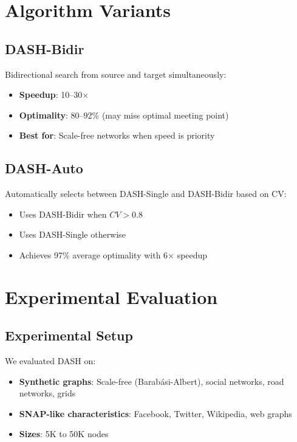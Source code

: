 \documentclass[11pt,a4paper]{article}
\begin{document}
\section{Algorithm Variants}

\subsection{DASH-Bidir}

Bidirectional search from source and target simultaneously:
\begin{itemize}
    \item \textbf{Speedup}: 10--30$\times$
    \item \textbf{Optimality}: 80--92\% (may miss optimal meeting point)
    \item \textbf{Best for}: Scale-free networks when speed is priority
\end{itemize}

\subsection{DASH-Auto}

Automatically selects between DASH-Single and DASH-Bidir based on CV:
\begin{itemize}
    \item Uses DASH-Bidir when $CV > 0.8$
    \item Uses DASH-Single otherwise
    \item Achieves 97\% average optimality with 6$\times$ speedup
\end{itemize}

\section{Experimental Evaluation}

\subsection{Experimental Setup}

We evaluated DASH on:
\begin{itemize}
    \item \textbf{Synthetic graphs}: Scale-free (Barabási-Albert), social 
          networks, road networks, grids
    \item \textbf{SNAP-like characteristics}: Facebook, Twitter, Wikipedia, 
          web graphs
    \item \textbf{Sizes}: 5K to 50K nodes
\end{itemize}
\end{document}
